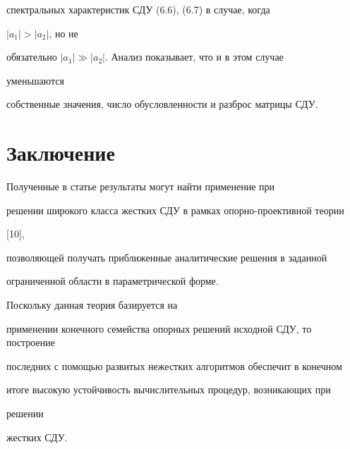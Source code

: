 спектральных характеристик СДУ (6.6), (6.7) в случае, когда 


$|a_1|>|a_2|$, но не 


обязательно $|a_1|\gg|a_2|$. Анализ показывает, что и в этом случае 


уменьшаются 


собственные значения, число обусловленности и разброс матрицы СДУ. 


 


 


\section{Заключение} 


 


Полученные в статье результаты могут найти применение при 


решении широкого класса жестких СДУ в рамках опорно-проективной теории 


[10], 


позволяющей получать приближенные аналитические решения в заданной 


ограниченной области в параметрической форме. 


Поскольку данная теория базируется на 


применении конечного семейства опорных решений исходной СДУ, то построение 


последних с помощью развитых нежестких алгоритмов обеспечит в конечном 


итоге высокую устойчивость вычислительных процедур, возникающих при 


решении 


жестких СДУ. 


 


